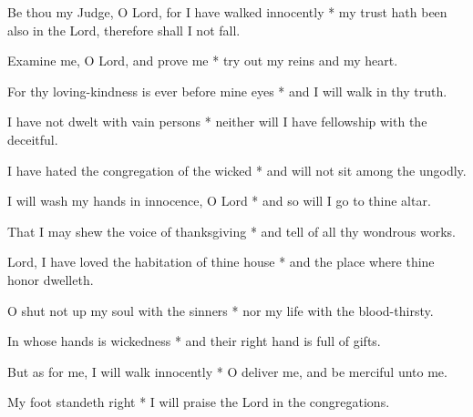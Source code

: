 Be thou my Judge, O Lord, for I have walked innocently * my trust hath been also in the Lord, therefore shall I not fall.

Examine me, O Lord, and prove me * try out my reins and my heart.

For thy loving-kindness is ever before mine eyes * and I will walk in thy truth.

I have not dwelt with vain persons * neither will I have fellowship with the deceitful.

I have hated the congregation of the wicked * and will not sit among the ungodly.

I will wash my hands in innocence, O Lord * and so will I go to thine altar.

That I may shew the voice of thanksgiving * and tell of all thy wondrous works.

Lord, I have loved the habitation of thine house * and the place where thine honor dwelleth.

O shut not up my soul with the sinners * nor my life with the blood-thirsty.

In whose hands is wickedness * and their right hand is full of gifts.

But as for me, I will walk innocently * O deliver me, and be merciful unto me.

My foot standeth right * I will praise the Lord in the congregations.